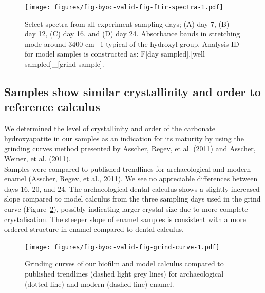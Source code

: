 \documentclass[
  letterpaper,
]{book}
\begin{document}
\begin{figure}

{\centering \texttt{[image: figures/fig-byoc-valid-fig-ftir-spectra-1.pdf]}

}

\caption{\label{fig-ftir-spectra}Select spectra from all experiment
sampling days; (A) day 7, (B) day 12, (C) day 16, and (D) day 24.
Absorbance bands in stretching mode around 3400 cm−1 typical of the
hydroxyl group. Analysis ID for model samples is constructed as: F{[}day
sampled{]}.{[}well sampled{]}\_{[}grind sample{]}.}

\end{figure}

\hypertarget{samples-show-similar-crystallinity-and-order-to-reference-calculus}{%
\subsection{Samples show similar crystallinity and order to reference
calculus}\label{samples-show-similar-crystallinity-and-order-to-reference-calculus}}

We determined the level of crystallinity and order of the carbonate
hydroxyapatite in our samples as an indication for its maturity by using
the grinding curves method presented by Asscher, Regev, et al.
(\protect\hyperlink{ref-asscherAtomicDisorder2011}{2011}) and Asscher,
Weiner, et al.
(\protect\hyperlink{ref-asscherVariationsAtomic2011}{2011}).\\
Samples were compared to published trendlines for archaeological and
modern enamel
(\protect\hyperlink{ref-asscherAtomicDisorder2011}{Asscher, Regev, et
al., 2011}). We see no appreciable differences between days 16, 20, and
24. The archaeological dental calculus shows a slightly increased slope
compared to model calculus from the three sampling days used in the
grind curve (Figure~\ref{fig-grind-curve}), possibly indicating larger
crystal size due to more complete crystalisation. The steeper slope of
enamel samples is consistent with a more ordered structure in enamel
compared to dental calculus.

\begin{figure}

{\centering \texttt{[image: figures/fig-byoc-valid-fig-grind-curve-1.pdf]}

}

\caption{\label{fig-grind-curve}Grinding curves of our biofilm and model
calculus compared to published trendlines (dashed light grey lines) for
archaeological (dotted line) and modern (dashed line) enamel.}

\end{figure}
\end{document}
